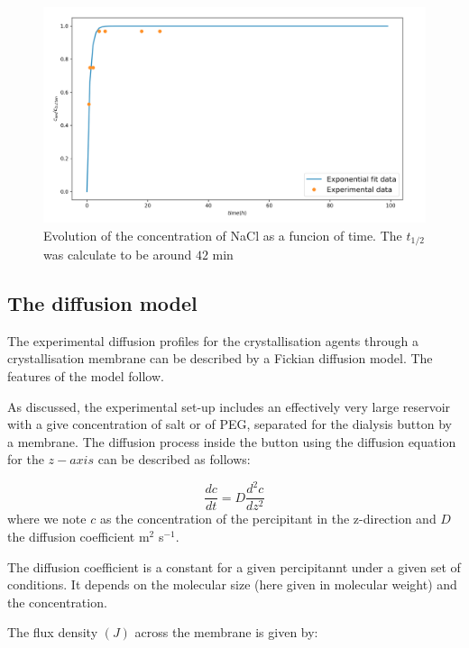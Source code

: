 \documentclass[11ptm,oneside,a4paper]{report}
\begin{document}
\begin{figure}[t]
  \begin{center}
      \includegraphics[scale=0.23]{figures/exponentional_fit_SALT.png}
      \caption{Evolution of the concentration of NaCl as a funcion of time. The $t_{1/2}$ was calculate to be around $42$ min  \label{exp-salt}}   
  \end{center} 
\end{figure}

\subsection{The diffusion model}\label{theory}

The experimental diffusion profiles for the crystallisation agents through a crystallisation membrane can be described by a Fickian diffusion model. The features of the model follow.

As discussed, the experimental set-up includes an effectively very large reservoir
with a give concentration of salt or of PEG, separated for the dialysis button by a 
membrane. The diffusion process inside the button using the 
diffusion equation for the $z-axis$ can be described as follows:

\begin{equation}
\frac{dc}{dt} = D \frac{d^2 c}{dz^2}
\end{equation}
where we note $c$ as the concentration of the percipitant in the z-direction and 
$D$ the diffusion coefficient m$^2$ s$^{-1}$.

The diffusion coefficient is a constant for a given percipitannt under a given set of conditions. It depends on the molecular size (here given in molecular weight) and the concentration. 

The flux density $(J)$ across the membrane is given by:
\end{document}

